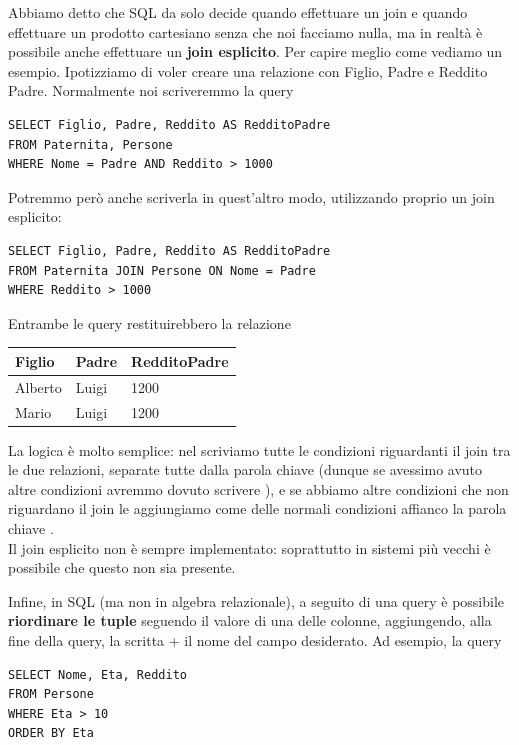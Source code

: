\documentclass[11pt, a4paper, titlepage, oneside]{scrbook}
\begin{document}
Abbiamo detto che SQL da solo decide quando effettuare un join e quando effettuare un prodotto cartesiano senza che noi facciamo nulla, ma in realtà è possibile anche effettuare un \textbf{join esplicito}. Per capire meglio come vediamo un esempio. Ipotizziamo di voler creare una relazione con Figlio, Padre e Reddito Padre. Normalmente noi scriveremmo la query
\begin{lstlisting}
SELECT Figlio, Padre, Reddito AS RedditoPadre
FROM Paternita, Persone
WHERE Nome = Padre AND Reddito > 1000
\end{lstlisting}

Potremmo però anche scriverla in quest'altro modo, utilizzando proprio un join esplicito:
\begin{lstlisting}
SELECT Figlio, Padre, Reddito AS RedditoPadre
FROM Paternita JOIN Persone ON Nome = Padre 
WHERE Reddito > 1000
\end{lstlisting}

Entrambe le query restituirebbero la relazione

\begin{center}
\begin{tabular}{|l|l|l|}
\hline
\textbf{Figlio} & \textbf{Padre} & \textbf{RedditoPadre} \\ \hline
Alberto & Luigi & 1200 \\
Mario & Luigi & 1200 \\ \hline
\end{tabular}
\end{center}

La logica è molto semplice: nel  scriviamo tutte le condizioni riguardanti il join tra le due relazioni, separate tutte dalla parola chiave  (dunque se avessimo avuto altre condizioni avremmo dovuto scrivere ), e se abbiamo altre condizioni che non riguardano il join le aggiungiamo come delle normali condizioni affianco la parola chiave .  \\
\NB Il join esplicito non è sempre implementato: soprattutto in sistemi più vecchi è possibile che questo non sia presente.

Infine, in SQL (ma non in algebra relazionale), a seguito di una query è possibile \textbf{riordinare le tuple} seguendo il valore di una delle colonne, aggiungendo, alla fine della query, la scritta  + il nome del campo desiderato. Ad esempio, la query

\begin{lstlisting}
SELECT Nome, Eta, Reddito 
FROM Persone
WHERE Eta > 10
ORDER BY Eta
\end{lstlisting}
\end{document}
